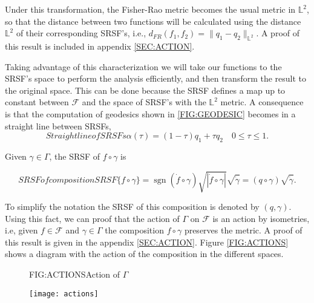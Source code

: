 Under this transformation, the Fisher-Rao metric becomes the usual metric
in $\mathbb{L}^2$, so that the distance between two functions will be
calculated using the distance $\mathbb{L}^2$ of their corresponding
SRSF's, i.e.,  $d_{FR}(f_1, f_2) = \| q_1 - q_2 \|_{\mathbb{L}^2}$. A proof of
this result is included in appendix \ref{SEC:ACTION}.

Taking advantage of this characterization we will take our functions to the
SRSF's space to perform the analysis efficiently, and then transform the result
to the original space. This can be done because the SRSF defines a map up to constant between
$\mathcal{F}$ and the space of SRSF's with the $\mathbb{L}^2$ metric.
A consequence is that the computation of geodesics shown in
\ref{FIG:GEODESIC} becomes in a straight line
between SRSFs,
\begin{equation}[]{Straight line of SRSFs}
\alpha(\tau) = (1 - \tau)q_1 + \tau q_2 \quad 0 \le \tau \le 1.
\end{equation}

Given $\gamma \in \Gamma$, the SRSF of $f \circ \gamma$ is

\begin{equation}[]{SRSF of composition}
SRSF\{f \circ \gamma\} = \operatorname{sgn}(\dot{f} \circ \gamma) \sqrt{|\dot f \circ \gamma|}
\sqrt{\dot \gamma} = (q \circ \gamma) \sqrt{\dot \gamma}.
\end{equation}

To simplify the
notation the SRSF of this composition is denoted by $(q, \gamma)$.
Using this fact, we can proof that the action of $\Gamma$ on $\mathscr{F}$ is an
action by isometries, i.e, given $f  \in \mathscr{F}$ and $\gamma \in \Gamma$
the composition $f \circ \gamma$ preserves the metric.
A proof of this result is given in the appendix \ref{SEC:ACTION}.
Figure \ref{FIG:ACTIONS} shows a diagram with the action of the composition
in the different spaces.

\begin{figure}[Action of $\Gamma$]{FIG:ACTIONS}{Action of $\Gamma$}

\texttt{[image: actions]}

\end{figure}
